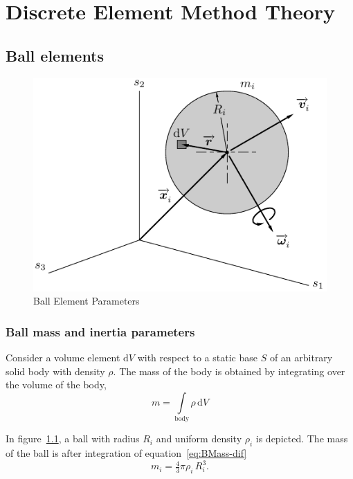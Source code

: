 \chapter{Discrete Element Method Theory} \label{app-a}
\label{chp:DEM-Theory}

\section{Ball elements}
\label{sec:Ball-elems}

\begin{figure}
   \centering
   \includegraphics{figs/DEM-Def-Ball}
   \caption{Ball Element Parameters}
   \label{fig:BallDef}
\end{figure}


\subsection{Ball mass and inertia parameters}

Consider a volume element $\mathrm{d}V$ with respect to a static base $S$ of
an arbitrary solid body with  density $\rho$. The mass of the body is
obtained by integrating over the volume of the body,
\begin{equation}
    m = \int\limits_{\mathrm{body}} \rho\, \mathrm{d}V
    \label{eq:BMass-dif}
\end{equation}

In figure~\ref{fig:BallDef}, a ball with radius $R_{i}$ and uniform density
$\rho_i$ is depicted. The mass of the ball is after integration of
equation~\eqref{eq:BMass-dif}
\begin{equation}
    m_i = \tfrac{4}{3} \pi \rho_i\, R_i^3 .
    \label{eq:BMass}
\end{equation}


\endinput

